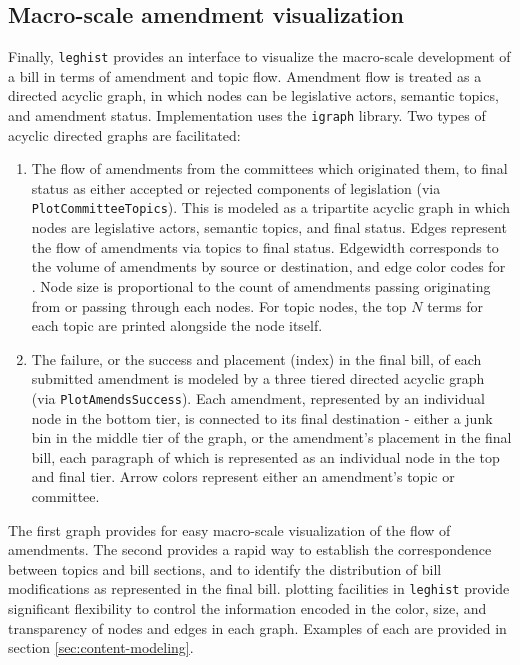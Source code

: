\documentclass[11pt]{article}
\begin{document}
\subsection{Macro-scale amendment visualization}
\label{sec:macro-scale-vis}

Finally, \texttt{leghist} provides an interface to visualize the
macro-scale development of a bill in terms of amendment and topic
flow. Amendment flow is treated as a directed acyclic graph, in which
nodes can be legislative actors, semantic topics, and amendment
status. Implementation uses the \texttt{igraph} library. Two types of acyclic directed graphs are facilitated:

\begin{enumerate}
\item The flow of amendments from the committees which originated
  them, to final status as either accepted or rejected components of
  legislation (via \texttt{PlotCommitteeTopics}). This is modeled as a tripartite acyclic graph in which
  nodes are legislative actors, semantic topics, and final
  status. Edges represent the flow of amendments via topics to final
  status. Edgewidth corresponds to the volume of amendments by source
  or destination, and edge color codes for . Node size is proportional
  to the count of amendments passing originating from or passing
  through each nodes. For topic nodes, the top $N$ terms for each
  topic are printed alongside the node itself.
\item The failure, or the success and placement (index) in the final
  bill, of each submitted amendment is modeled by a three tiered
  directed acyclic graph (via \texttt{PlotAmendsSuccess}). Each amendment, represented by an individual node in the bottom tier, is connected to its final destination - either a junk bin in the middle tier of the graph, or the amendment's placement in the final bill, each paragraph of which is represented as an individual node in the top and final tier. Arrow colors represent either an amendment's topic or committee.
\end{enumerate}

The first graph provides for easy macro-scale visualization of the
flow of amendments. The second provides a rapid way to establish the
correspondence between topics and bill sections, and to identify the
distribution of bill modifications as represented in the final
bill. plotting facilities in \texttt{leghist} provide significant
flexibility to control the information encoded in the color, size, and
transparency of nodes and edges in each graph. Examples of each are provided in section
\ref{sec:content-modeling}. 
\end{document}
